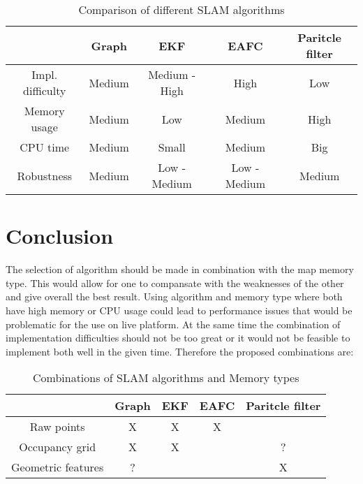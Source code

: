 \documentclass[12pt, a4paper, onecolumn]{article}
\begin{document}
\begin{table}[h!]
  \begin{center}
    \begin{tabular}[c]{|c | c c c c |}
      \hline
                       & Graph          & EKF           & EAFC         & Paritcle filter \\
      \hline
      Impl. difficulty & Medium         & Medium - High & High         & Low \\
      \hline
      Memory usage     & Medium         & Low           & Medium       & High \\
      \hline
      CPU time         & Medium         & Small         & Medium       & Big \\
      \hline
      Robustness       & Medium         & Low - Medium  & Low - Medium & Medium \\
      \hline
    \end{tabular}
  \end{center}
  \caption{Comparison of different SLAM algorithms}
  \label{tab:slam_algorithms}
\end{table}

\section{Conclusion}

The selection of algorithm should be made in combination with the map memory type.
This would allow for one to compansate with the weaknesses of the other and give overall the best result.
Using algorithm and memory type where both have high memory or CPU usage could lead to performance issues that would be problematic for the use on live platform.
At the same time the combination of implementation difficulties should not be too great or it would not be feasible to implement both well in the given time.
Therefore the proposed combinations are:

\begin{table}[h!]
  \begin{center}
    \begin{tabular}[c]{|c | c c c c |}
      \hline
                         & Graph & EKF & EAFC & Paritcle filter \\
      \hline
      Raw points         & X     & X   & X    &  \\
      \hline
      Occupancy grid     & X     & X   &      & ? \\
      \hline
      Geometric features & ?     &     &      & X \\
      \hline
    \end{tabular}
  \end{center}
  \caption{Combinations of SLAM algorithms and Memory types}
  \label{tab:slam_memory_combinations}
\end{table}
\end{document}
